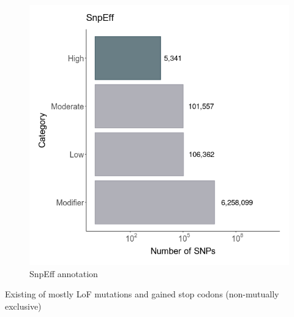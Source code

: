 \documentclass[
  letterpaper,
  DIV=11,
  numbers=noendperiod]{scrreprt}
\begin{document}
\begin{figure}

{\centering \includegraphics{qmd/../plots/main/fig_1b.png}

}

\caption{SnpEff annotation}

\end{figure}

Existing of mostly LoF mutations and gained stop codons (non-mutually
exclusive)
\end{document}
